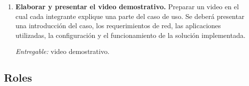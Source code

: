 \documentclass[12pt,a4paper]{article}
\begin{document}
\begin{enumerate}[label=\textbf{M\arabic*.}, leftmargin=*]
    \textit{Entregable:} código fuente y documentación técnica de la solución.

    \item \textbf{Elaborar y presentar el video demostrativo.}
    Preparar un video en el cual cada integrante explique una parte del caso de uso. Se deberá presentar una introducción del caso, los requerimientos de red, las aplicaciones utilizadas, la configuración y el funcionamiento de la solución implementada.

    \textit{Entregable:} video demostrativo.

\end{enumerate}


\subsection{Roles}
\end{document}
